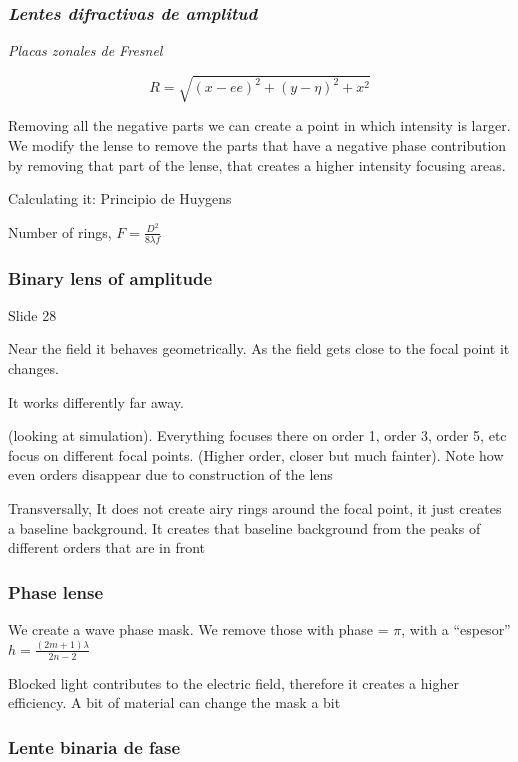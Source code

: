 \documentclass[../main/main.tex]{subfiles}
\begin{document}
\subsubsection{\emph{Lentes difractivas de amplitud}}

\emph{Placas zonales de Fresnel}

\begin{equation}
R = \sqrt{(x-ee)^{2} + (y-\eta)^{2} + x^{2}}
\end{equation}

Removing all the negative parts we can create a point in which intensity is larger. We modify the lense to remove the parts that have a negative phase contribution by removing that part of the lense, that creates a higher intensity focusing areas.

Calculating it: Principio de Huygens

Number of rings, $F= \frac{D^{2}}{8 \lambda f}$

\subsubsection*{Binary lens of amplitude}

Slide 28

Near the field it behaves geometrically. As the field gets close to the focal point it changes.

It works differently far away.

(looking at simulation). Everything focuses there on order 1, order 3, order 5, etc focus on different focal points.  (Higher order, closer but much fainter). Note how even orders disappear due to construction of the lens

Transversally, It does not create airy rings around the focal point, it just creates a baseline background. It creates that baseline background from the peaks of different orders that are in front

\subsubsection*{Phase lense}

We create a wave phase mask. We remove those with phase = $\pi$, with a ``espesor''$h =\frac{(2m + 1)\lambda}{2n -2}$

Blocked light contributes to the electric field, therefore it creates a higher efficiency. A bit of material can change the mask a bit

\subsubsection*{Lente binaria de fase}
\end{document}
